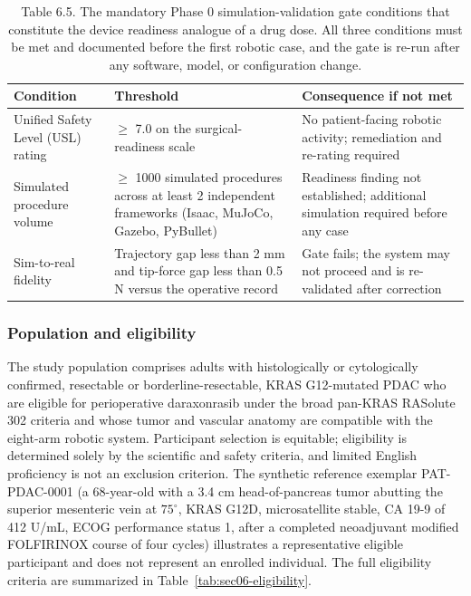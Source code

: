 \begin{table}[t]
\caption{Table 6.5. The mandatory Phase 0 simulation-validation gate conditions that
constitute the device readiness analogue of a drug dose. All three conditions must
be met and documented before the first robotic case, and the gate is re-run after
any software, model, or configuration change.}
\label{tab:sec06-phase0}
\centering
\begin{tabularx}{\textwidth}{L{3.2cm} L{6.2cm} Y}
\toprule
\textbf{Condition} & \textbf{Threshold} & \textbf{Consequence if not met} \\
\midrule
Unified Safety Level (USL) rating & $\geq$ 7.0 on the surgical-readiness scale & No patient-facing robotic activity; remediation and re-rating required \\
Simulated procedure volume & $\geq$ 1000 simulated procedures across at least 2 independent frameworks (Isaac, MuJoCo, Gazebo, PyBullet) & Readiness finding not established; additional simulation required before any case \\
Sim-to-real fidelity & Trajectory gap less than 2 mm and tip-force gap less than 0.5 N versus the operative record & Gate fails; the system may not proceed and is re-validated after correction \\
\bottomrule
\end{tabularx}
\end{table}

\subsubsection*{Population and eligibility}

The study population comprises adults with histologically or cytologically confirmed,
resectable or borderline-resectable, KRAS G12-mutated PDAC who are eligible for
perioperative daraxonrasib under the broad pan-KRAS RASolute 302 criteria and whose
tumor and vascular anatomy are compatible with the eight-arm robotic system.
Participant selection is equitable; eligibility is determined solely by the
scientific and safety criteria, and limited English proficiency is not an exclusion
criterion. The synthetic reference exemplar PAT-PDAC-0001 (a 68-year-old with a
3.4 cm head-of-pancreas tumor abutting the superior mesenteric vein at $75^\circ$,
KRAS G12D, microsatellite stable, CA 19-9 of 412 U/mL, ECOG performance status 1,
after a completed neoadjuvant modified FOLFIRINOX course of four cycles) illustrates
a representative eligible participant and does not represent an enrolled individual.
The full eligibility criteria are summarized in Table~\ref{tab:sec06-eligibility}.


